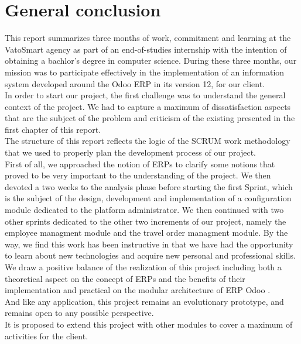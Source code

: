 \chapter*{General conclusion}
This report summarizes three months of work, commitment and learning at the VatoSmart agency as part of an end-of-studies internship with the intention of obtaining a bachlor's degree in computer science. 
During these three months, our mission was to participate effectively in the implementation of an information system developed around the Odoo ERP in its version 12, for our client.\\
In order to start our project, the first challenge was to understand the general context of the project. We had to capture a maximum of dissatisfaction aspects that are the subject of the problem and criticism of the existing presented in the first chapter of this report.\\
The structure of this report reflects the logic of the SCRUM work methodology that we used to properly plan the development process of our project.\\
First of all, we approached the notion of ERPs to clarify some notions that proved to be very important to the understanding of the project. We then devoted a two weeks  to the analysis phase before starting the first Sprint, which is the subject of the design, development and implementation of a configuration module  dedicated to the platform administrator. We then continued with two other sprints dedicated to the other two increments of our project, namely the employee managment module and the travel order managment module. 
By the way, we find this work has been instructive in that we have had the opportunity to learn about new technologies and acquire new personal and professional skills. We draw a positive balance of the realization of this project including both a theoretical aspect on the concept of ERPs and the benefits of their implementation and practical on the modular architecture of ERP Odoo .\\
And like any application, this project remains an evolutionary prototype, and remains open to any possible perspective. \\
It is proposed to extend this project with other modules to cover a maximum of activities for the client.
